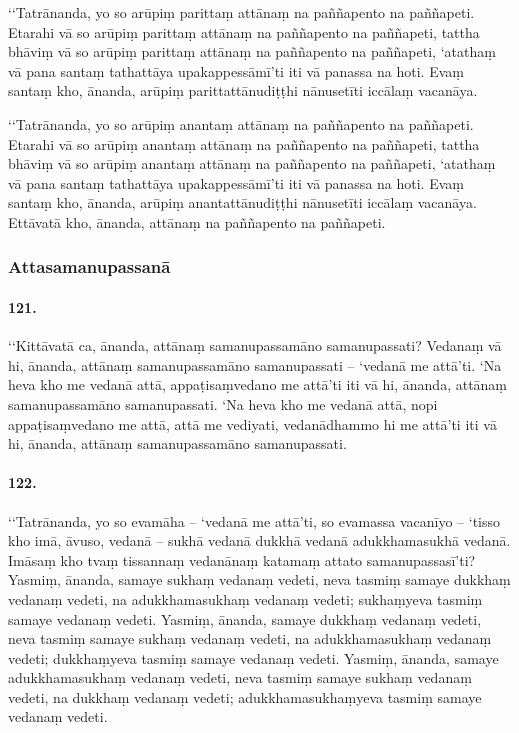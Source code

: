 ‘‘Tatrānanda, yo so arūpiṃ parittaṃ attānaṃ na paññapento na paññapeti. Etarahi vā so arūpiṃ parittaṃ attānaṃ na paññapento na paññapeti, tattha bhāviṃ vā so arūpiṃ parittaṃ attānaṃ na paññapento na paññapeti, ‘atathaṃ vā pana santaṃ tathattāya upakappessāmī’ti iti vā panassa na hoti. Evaṃ santaṃ kho, ānanda, arūpiṃ parittattānudiṭṭhi nānusetīti iccālaṃ vacanāya.

‘‘Tatrānanda, yo so arūpiṃ anantaṃ attānaṃ na paññapento na paññapeti. Etarahi vā so arūpiṃ anantaṃ attānaṃ na paññapento na paññapeti, tattha bhāviṃ vā so arūpiṃ anantaṃ attānaṃ na paññapento na paññapeti, ‘atathaṃ vā pana santaṃ tathattāya upakappessāmī’ti iti vā panassa na hoti. Evaṃ santaṃ kho, ānanda, arūpiṃ anantattānudiṭṭhi nānusetīti iccālaṃ vacanāya. Ettāvatā kho, ānanda, attānaṃ na paññapento na paññapeti.

\subsubsection{Attasamanupassanā}

\paragraph{121.} ‘‘Kittāvatā ca, ānanda, attānaṃ samanupassamāno samanupassati? Vedanaṃ vā hi, ānanda, attānaṃ samanupassamāno samanupassati – ‘vedanā me attā’ti. ‘Na heva kho me vedanā attā, appaṭisaṃvedano me attā’ti iti vā hi, ānanda, attānaṃ samanupassamāno samanupassati. ‘Na heva kho me vedanā attā, nopi appaṭisaṃvedano me attā, attā me vediyati, vedanādhammo hi me attā’ti iti vā hi, ānanda, attānaṃ samanupassamāno samanupassati.

\paragraph{122.} ‘‘Tatrānanda, yo so evamāha – ‘vedanā me attā’ti, so evamassa vacanīyo – ‘tisso kho imā, āvuso, vedanā – sukhā vedanā dukkhā vedanā adukkhamasukhā vedanā. Imāsaṃ kho tvaṃ tissannaṃ vedanānaṃ katamaṃ attato samanupassasī’ti? Yasmiṃ, ānanda, samaye sukhaṃ vedanaṃ vedeti, neva tasmiṃ samaye dukkhaṃ vedanaṃ vedeti, na adukkhamasukhaṃ vedanaṃ vedeti; sukhaṃyeva tasmiṃ samaye vedanaṃ vedeti. Yasmiṃ, ānanda, samaye dukkhaṃ vedanaṃ vedeti, neva tasmiṃ samaye sukhaṃ vedanaṃ vedeti, na adukkhamasukhaṃ vedanaṃ vedeti; dukkhaṃyeva tasmiṃ samaye vedanaṃ vedeti. Yasmiṃ, ānanda, samaye adukkhamasukhaṃ vedanaṃ vedeti, neva tasmiṃ samaye sukhaṃ vedanaṃ vedeti, na dukkhaṃ vedanaṃ vedeti; adukkhamasukhaṃyeva tasmiṃ samaye vedanaṃ vedeti.


